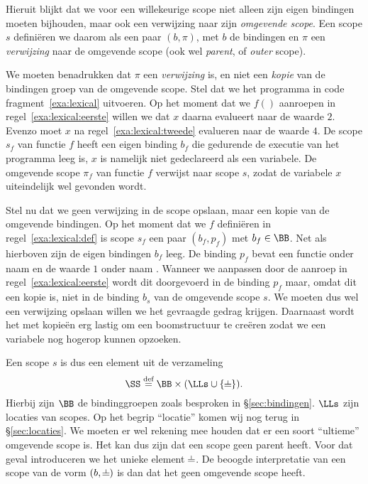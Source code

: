 Hieruit blijkt dat we voor een willekeurige scope niet alleen zijn eigen bindingen moeten bijhouden, maar ook een verwijzing naar zijn \emph{omgevende scope}. Een scope $s$ definiëren we daarom als een paar $(b, \pi)$, met $b$ de bindingen en $\pi$ een \emph{verwijzing} naar de omgevende scope (ook wel \emph{parent}, of \emph{outer} scope).

We moeten benadrukken dat $\pi$ een \emph{verwijzing} is, en niet een \emph{kopie} van de bindingen groep van de omgevende scope. Stel dat we het programma in code fragment~\ref{exa:lexical} uitvoeren. Op het moment dat we $f()$ aanroepen in regel~\ref{exa:lexical:eerste} willen we dat $x$ daarna evalueert naar de waarde $2$. Evenzo moet $x$ na regel~\ref{exa:lexical:tweede} evalueren naar de waarde $4$. De scope $s_f$ van functie $f$ heeft een eigen binding $b_f$ die gedurende de executie van het programma leeg is, $x$ is namelijk niet gedeclareerd als een \LOCAL variabele. De omgevende scope $\pi_f$ van functie $f$ verwijst naar scope $s$, zodat de variabele $x$ uiteindelijk wel gevonden wordt.

\codeFragmentCaption
{}

Stel nu dat we geen verwijzing in de scope opslaan, maar een kopie van de omgevende bindingen. Op het moment dat we $f$ definiëren in regel~\ref{exa:lexical:def} is scope $s_f$ een paar $(b_f, p_f)$ met $b_f \in \BB$. Net als hierboven zijn de eigen bindingen $b_f$ leeg. De binding $p_f$ bevat een functie onder naam  en de waarde $1$ onder naam . Wanneer we  aanpassen door de aanroep in regel~\ref{exa:lexical:eerste} wordt dit doorgevoerd in de binding $p_f$ maar, omdat dit een kopie is, niet in de binding $b_s$ van de omgevende scope $s$. We moeten dus wel een verwijzing opslaan willen we het gevraagde gedrag krijgen. Daarnaast wordt het met kopieën erg lastig om een boomstructuur te creëren zodat we een variabele nog hogerop kunnen opzoeken.

Een scope $s$ is dus een element uit de verzameling
%
\begin{equation*}
  \SS \DEF \BB \times (\LLs \cup \{\nil\}).
\end{equation*}
%
Hierbij zijn $\BB$ de bindinggroepen zoals besproken in §\ref{sec:bindingen}. $\LLs$ zijn locaties van scopes. Op het begrip ``locatie'' komen wij nog terug in §\ref{sec:locaties}. We moeten er wel rekening mee houden dat er een soort ``ultieme'' omgevende scope is. Het kan dus zijn dat een scope geen parent heeft. Voor dat geval introduceren we het unieke element $\nil$. De beoogde interpretatie van een scope van de vorm $(b, \nil)$ is dan dat het geen omgevende scope heeft.

